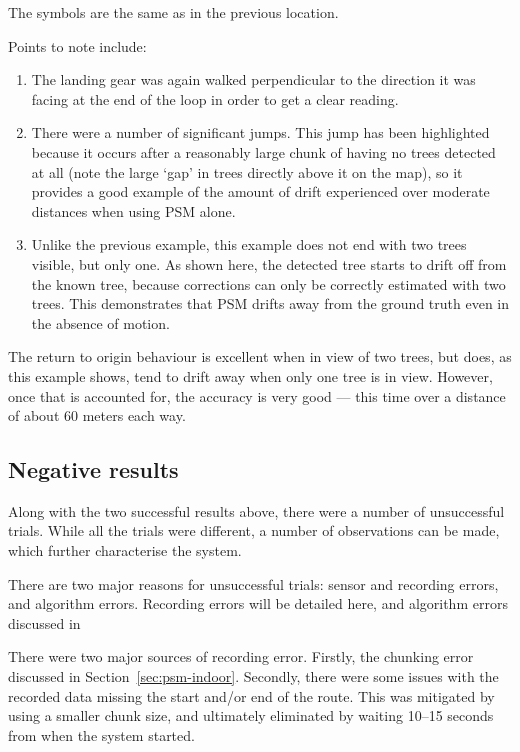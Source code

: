 \documentclass[12pt,oneside,a4paper]{book}
\begin{document}
The symbols are the same as in the previous location.

Points to note include:
\begin{enumerate}[A:]
\item The landing gear was again walked perpendicular to the direction
  it was facing at the end of the loop in order to get a clear
  reading.
\item There were a number of significant jumps. This jump has been
  highlighted because it occurs after a reasonably large chunk of
  having no trees detected at all (note the large `gap' in trees
  directly above it on the map), so it provides a good example of the
  amount of drift experienced over moderate distances when using PSM
  alone.
\item Unlike the previous example, this example does not end with two
  trees visible, but only one. As shown here, the detected tree starts
  to drift off from the known tree, because corrections can only be
  correctly estimated with two trees. This demonstrates that PSM
  drifts away from the ground truth even in the absence of motion.
\end{enumerate}

The return to origin behaviour is excellent when in view of two trees,
but does, as this example shows, tend to drift away when only one tree
is in view. However, once that is accounted for, the accuracy is very
good --- this time over a distance of about 60 meters each way.

\subsection{Negative results}
\label{sec:negative-results}

Along with the two successful results above, there were a number of
unsuccessful trials. While all the trials were different, a number of
observations can be made, which further characterise the system.

There are two major reasons for unsuccessful trials: sensor and
recording errors, and algorithm errors. Recording errors will be
detailed here, and algorithm errors discussed in 

There were two major sources of recording error. Firstly, the chunking
error discussed in Section~\ref{sec:psm-indoor}. Secondly, there were some
issues with the recorded data missing the start and/or end of the
route. This was mitigated by using a smaller chunk size, and
ultimately eliminated by waiting 10--15 seconds from when the system
started.
\end{document}
